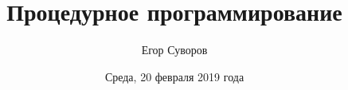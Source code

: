 \documentclass[utf8,xcolor=table]{beamer}
\title{Процедурное программирование}
\author{Егор Суворов}
\institute[СПбГУ]{Курс <<Парадигмы и языки программирования>>, группа 18.Б09-пу}
\date[20.02.2019]{Среда, 20 февраля 2019 года}
\begin{document}
\begin{frame}
\titlepage
\end{frame}



\end{document}
